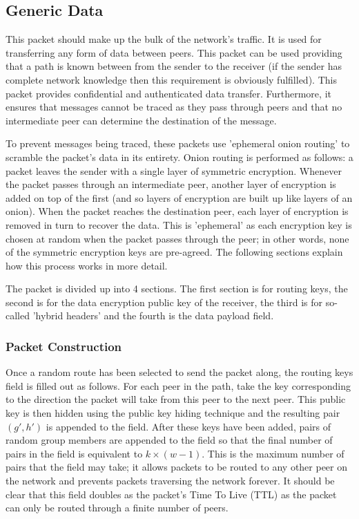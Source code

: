 \documentclass[ %
                    author={Luke Murray},
                supervisor={Dr. Simon Hollis},
                     title={Shadow Peer-to-Peer Networks},
                  subtitle={},
                    degree={MEng},
                      year={2013} ]{thesis}
\begin{document}
\subsection{Generic Data}

This packet should make up the bulk of the network's traffic. It is used for transferring any form of data between peers. This packet can be used providing that a path is known between from the sender to the receiver (if the sender has complete network knowledge then this requirement is obviously fulfilled). This packet provides confidential and authenticated data transfer. Furthermore, it ensures that messages cannot be traced as they pass through peers and that no intermediate peer can determine the destination of the message.

To prevent messages being traced, these packets use 'ephemeral onion routing' to scramble the packet's data in its entirety. Onion routing is performed as follows: a packet leaves the sender with a single layer of symmetric encryption. Whenever the packet passes through an intermediate peer, another layer of encryption is added on top of the first (and so layers of encryption are built up like layers of an onion). When the packet reaches the destination peer, each layer of encryption is removed in turn to recover the data. This is 'ephemeral' as each encryption key is chosen at random when the packet passes through the peer; in other words, none of the symmetric encryption keys are pre-agreed. The following sections explain how this process works in more detail.

The packet is divided up into 4 sections. The first section is for routing keys, the second is for the data encryption public key of the receiver, the third is for so-called 'hybrid headers' and the fourth is the data payload field.

\subsubsection{Packet Construction}

Once a random route has been selected to send the packet along, the routing keys field is filled out as follows. For each peer in the path, take the key corresponding to the direction the packet will take from this peer to the next peer. This public key is then hidden using the public key hiding technique and the resulting pair $(g\prime, h\prime)$ is appended to the field. After these keys have been added, pairs of random group members are appended to the field so that the final number of pairs in the field is equivalent to $k \times (w - 1)$. This is the maximum number of pairs that the field may take; it allows packets to be routed to any other peer on the network and prevents packets traversing the network forever. It should be clear that this field doubles as the packet's Time To Live (TTL) as the packet can only be routed through a finite number of peers.
\end{document}
